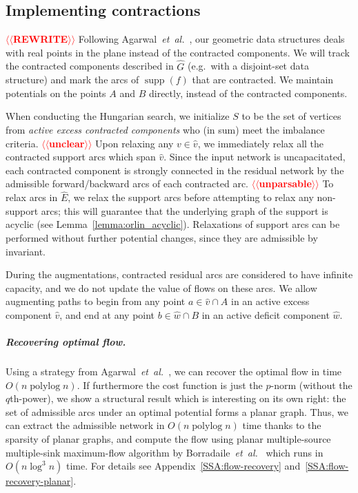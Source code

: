 \documentclass[a4paper,UKenglish]{socg-lipics-v2018}
\makeatletter
\def\etal{\emph{et~al.}}
\def\etal{\textit{et~al.}}
\def\polylog{\mathop{\mathrm{polylog}}}
\def\supp{\operatorname{supp}}
\theoremstyle{plain}
\numberwithin{figure}{section}
\renewcommand{\paragraph}{\subparagraph}
\def\EMPH#1{\textcolor{BrickRed}{{\emph{#1}}}}
\def\n@te#1{\textsf{\boldmath \textbf{$\langle\!\langle$#1$\rangle\!\rangle$}}\leavevmode}
\def\note#1{\textcolor{red}{\n@te{#1}}}
\makeatother
\begin{document}
\begin{toappendix}
\subsection{Implementing contractions}
\label{SSA:contraction}

\note{REWRITE}
Following Agarwal~\etal~\cite{AFPVX17}, our geometric data structures deals
with real points in the plane instead of the contracted components.
We will track the contracted components described in $\hat{G}$ (e.g.\ with a
disjoint-set data structure) and mark the arcs of $\supp(f)$ that are
contracted.
We maintain potentials on the points $A$ and $B$ directly, instead of the
contracted components.

When conducting the Hungarian search, we initialize $S$ to be the set of vertices from
\EMPH{active excess contracted components} who (in sum) meet the imbalance
criteria. \note{unclear}
Upon relaxing any $v \in \hat{v}$, we immediately relax all the contracted
support arcs which span $\hat{v}$.
Since the input network is uncapacitated, each contracted component is
strongly connected in the residual network by the admissible forward/backward
arcs of each contracted arc. \note{unparsable}
To relax arcs in $\hat{E}$, we relax the support arcs before attempting to
relax any non-support arcs; this will guarantee that the underlying graph of the support is acyclic (see Lemma~\ref{lemma:orlin_acyclic}).
Relaxations of support arcs can be performed without further potential changes,
since they are admissible by invariant.

During the augmentations, contracted residual arcs are considered to have infinite
capacity, and we do not update the value of flows on these arcs.
We allow augmenting paths to begin from any point $a \in \hat{v} \cap A$ in an active
excess component $\hat{v}$, and end at any point $b \in \hat{w} \cap B$ in an active
deficit component $\hat{w}$.

\end{toappendix}

\paragraph{Recovering optimal flow.}
Using a strategy from Agarwal~\etal~\cite{AFPVX17}, we can recover the optimal
flow in time $O(n\polylog n)$.
%
If furthermore the cost function is just the $p$-norm (without the $q$th-power),
we show a structural result which is interesting on its own right:
the set of admissible arcs under an optimal potential forms a planar graph.
Thus, we can extract the admissible network in $O(n\polylog n)$ time thanks
to the sparsity of planar graphs, and compute the flow using planar
multiple-source multiple-sink maximum-flow algorithm by
Borradaile~\etal~\cite{BKMNW17} which runs in $O(n\log^3 n)$ time.
For details see Appendix~\ref{SSA:flow-recovery} and~\ref{SSA:flow-recovery-planar}.
\end{document}

